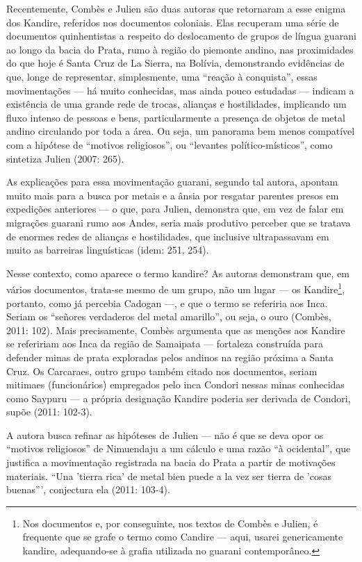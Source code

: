 Recentemente, Combès e Julien são duas autoras que retornaram a esse
enigma dos Kandire, referidos nos documentos coloniais. Elas recuperam
uma série de documentos quinhentistas a respeito do deslocamento de
grupos de língua guarani ao longo da bacia do Prata, rumo à região do
piemonte andino, nas proximidades do que hoje é Santa Cruz de La
Sierra, na Bolívia, demonstrando evidências de que, longe de
representar, simplesmente, uma ``reação à conquista'', essas
movimentações --- há muito conhecidas, mas ainda pouco estudadas ---
indicam a existência de uma grande rede de trocas, alianças e
hostilidades, implicando um fluxo intenso de pessoas e bens,
particularmente a presença de objetos de metal andino circulando por
toda a área. Ou seja, um panorama bem menos compatível com a hipótese
de ``motivos religiosos'', ou ``levantes político-místicos'', como
sintetiza Julien (2007: 265).

As explicações para essa movimentação guarani, segundo tal autora,
apontam muito mais para a busca por metais e a ânsia por resgatar
parentes presos em expedições anteriores --- o que, para Julien,
demonstra que, em vez de falar em migrações guarani rumo aos Andes,
seria mais produtivo perceber que se tratava de enormes redes de
alianças e hostilidades, que inclusive ultrapassavam em muito as
barreiras linguísticas (idem: 251, 254).

Nesse contexto, como aparece o termo kandire? As autoras demonstram que,
em vários documentos, trata-se mesmo de um grupo, não um lugar --- os
Kandire\footnote{Nos documentos e, por conseguinte, nos textos de
Combès e Julien, é frequente que se grafe o termo como Candire --- aqui,
usarei genericamente kandire, adequando-se à grafia utilizada no
guarani contemporâneo.}, portanto, como já percebia Cadogan ---, e que o
termo se referiria aos Inca. Seriam os ``señores verdaderos del metal
amarillo'', ou seja, o ouro (Combès, 2011: 102). Mais precisamente,
Combès argumenta que as menções aos Kandire se refeririam aos Inca da
região de Samaipata --- fortaleza construída para defender minas de prata
exploradas pelos andinos na região próxima a Santa Cruz. Os Carcaraes,
outro grupo também citado nos documentos, seriam mitimaes
(funcionários) empregados pelo inca Condori nessas minas conhecidas
como Saypuru --- a própria designação Kandire poderia ser derivada de
Condori, supõe (2011: 102-3).

A autora busca refinar as hipóteses de Julien --- não é que se deva opor
os ``motivos religiosos'' de Nimuendaju a um cálculo e uma razão ``à
ocidental'', que justifica a movimentação registrada na bacia do Prata a
partir de motivações materiais. ``Una 'tierra
rica' de metal bien puede a la vez ser tierra de
'cosas buenas''', conjectura ela
(2011: 103-4).

